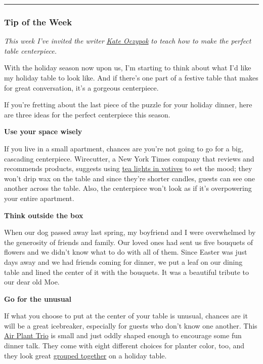 \begin{center}\rule{0.5\linewidth}{\linethickness}\end{center}

\hypertarget{tip-of-the-week}{%
\subsubsection{Tip of the Week}\label{tip-of-the-week}}

\emph{This week I've invited the writer}
\href{https://twitter.com/OczyKate}{\emph{Kate Oczypok}} \emph{to teach
how to make the perfect table centerpiece.}

With the holiday season now upon us, I'm starting to think about what
I'd like my holiday table to look like. And if there's one part of a
festive table that makes for great conversation, it's a gorgeous
centerpiece.

If you're fretting about the last piece of the puzzle for your holiday
dinner, here are three ideas for the perfect centerpiece this season.

\textbf{Use your space wisely}

If you live in a small apartment, chances are you're not going to go for
a big, cascading centerpiece. Wirecutter, a New York Times company that
reviews and recommends products, suggests using
\href{https://thewirecutter.com/lists/how-to-set-the-table-for-your-first-dinner-party/}{tea
lights in votives} to set the mood; they won't drip wax on the table and
since they're shorter candles, guests can see one another across the
table. Also, the centerpiece won't look as if it's overpowering your
entire apartment.

\textbf{Think outside the box}

When our dog passed away last spring, my boyfriend and I were
overwhelmed by the generosity of friends and family. Our loved ones had
sent us five bouquets of flowers and we didn't know what to do with all
of them. Since Easter was just days away and we had friends coming for
dinner, we put a leaf on our dining table and lined the center of it
with the bouquets. It was a beautiful tribute to our dear old Moe.

\textbf{Go for the unusual}

If what you choose to put at the center of your table is unusual,
chances are it will be a great icebreaker, especially for guests who
don't know one another. This
\href{https://www.thesill.com/products/air-plant-assortment-1?variant=30392047239273}{Air
Plant Trio} is small and just oddly shaped enough to encourage some fun
dinner talk. They come with eight different choices for planter color,
too, and they look great
\href{https://thewirecutter.com/gifts/best-hostess-gifts/}{grouped
together} on a holiday table.

